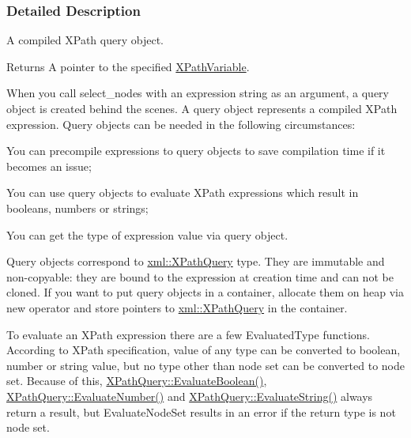 \subsubsection{Detailed Description}
A compiled XPath query object. \begin{DoxyReturn}{Returns}
A pointer to the specified \hyperlink{classMezzanine_1_1xml_1_1XPathVariable}{XPathVariable}.
\end{DoxyReturn}
When you call select\_\-nodes with an expression string as an argument, a query object is created behind the scenes. A query object represents a compiled XPath expression. Query objects can be needed in the following circumstances: \par

\begin{DoxyItemize}
\item You can precompile expressions to query objects to save compilation time if it becomes an issue; \par

\item You can use query objects to evaluate XPath expressions which result in booleans, numbers or strings; \par

\item You can get the type of expression value via query object. \par
 \par
 Query objects correspond to \hyperlink{classMezzanine_1_1xml_1_1XPathQuery}{xml::XPathQuery} type. They are immutable and non-\/copyable: they are bound to the expression at creation time and can not be cloned. If you want to put query objects in a container, allocate them on heap via new operator and store pointers to \hyperlink{classMezzanine_1_1xml_1_1XPathQuery}{xml::XPathQuery} in the container. \par
 \par
 To evaluate an XPath expression there are a few EvaluatedType functions. According to XPath specification, value of any type can be converted to boolean, number or string value, but no type other than node set can be converted to node set. Because of this, \hyperlink{classMezzanine_1_1xml_1_1XPathQuery_a3bcbef02da73108550e940ee3de50267}{XPathQuery::EvaluateBoolean()}, \hyperlink{classMezzanine_1_1xml_1_1XPathQuery_a716de15af35a38cb5a4a661ab25b852f}{XPathQuery::EvaluateNumber()} and \hyperlink{classMezzanine_1_1xml_1_1XPathQuery_a373271959b00d96b08a846b2e56607c3}{XPathQuery::EvaluateString()} always return a result, but EvaluateNodeSet results in an error if the return type is not node set. 
\end{DoxyItemize}

